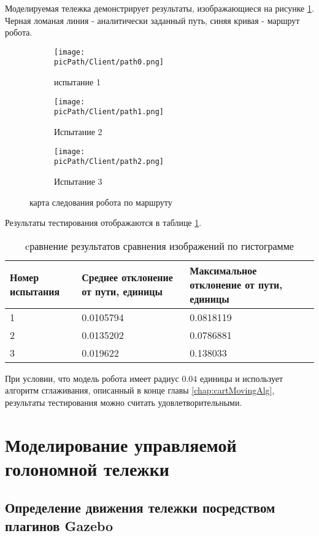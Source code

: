 \documentclass[oneside,final,14pt]{extreport}
\newcommand{\picPath}{img}
\begin{document}
Моделируемая тележка демонстрирует результаты, изображающиеся на рисунке \ref{Figure:tests}. Черная ломаная линия - аналитически заданный путь, синяя кривая - маршрут робота. 


\begin{figure}[H]
  \centering
  \begin{subfigure}[b]{0.3\linewidth}
   \texttt{[image: \\picPath/Client/path0.png]}
    \caption{  испытание 1}
  \end{subfigure}
  \begin{subfigure}[b]{0.3\linewidth}
    \texttt{[image: \\picPath/Client/path1.png]}
    \caption{ Испытание 2}
  \end{subfigure}
   \begin{subfigure}[b]{0.3\linewidth}
    \texttt{[image: \\picPath/Client/path2.png]}
    \caption{ Испытание 3}
  \end{subfigure}

  \caption{ карта следования робота по маршруту }
  \label{Figure:tests}
\end{figure}

Результаты тестирования отображаются в таблице \ref{table:test}.  
\begin{table}[H] 
\caption{cравнение результатов сравнения изображений по гистограмме}
\label{table:test}
\begin{tabularx}{\textwidth}{|X|X|X|}
\hline
Номер испытания
&
Среднее отклонение от пути, единицы
&
Максимальное отклонение от пути, единицы
\\
\hline
1
&
 0.0105794
& 
 0.0818119 
\\
\hline
2
&
 0.0135202
& 
 0.0786881 
\\
\hline
3
&
 0.019622
& 
 0.138033
\\
\hline
\end{tabularx}
\end{table}
  
При условии, что модель робота имеет радиус $0.04$ единицы и использует алгоритм сглаживания, описанный в конце главы \ref{chap:cartMovingAlg}, результаты тестирования можно считать удовлетворительными.

\iffalse
\section{Моделирование управляемой голономной тележки}
\subsection{Определение движения тележки посредством плагинов Gazebo}
\end{document}

